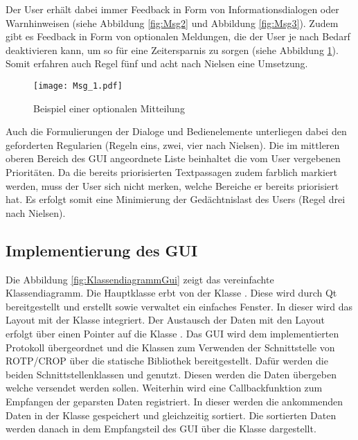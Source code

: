 Der User erh{\"a}lt dabei immer Feedback in Form von
Informationsdialogen oder Warnhinweisen (siehe Abbildung \ref{fig:Msg2} und
Abbildung
\ref{fig:Msg3}). Zudem gibt es Feedback in Form von optionalen Meldungen, die
der User je nach Bedarf deaktivieren kann, um so f{\"u}r eine Zeitersparnis zu
sorgen (siehe Abbildung \ref{fig:Msg1}). Somit erfahren auch Regel f{\"u}nf und
acht nach Nielsen eine Umsetzung.

\begin{figure}[H]
	\centering
	\texttt{[image: Msg\_1.pdf]}
	\caption{Beispiel einer optionalen Mitteilung}
	\label{fig:Msg1}
\end{figure}

Auch die Formulierungen der Dialoge und Bedienelemente unterliegen dabei den
geforderten Regularien (Regeln eins, zwei, vier nach Nielsen). Die im mittleren
oberen Bereich des \gls{GUI} angeordnete Liste beinhaltet die vom User
vergebenen Priorit{\"a}ten. Da die bereits priorisierten Textpassagen zudem farblich
markiert werden, muss der User sich nicht merken, welche Bereiche er bereits
priorisiert hat. Es erfolgt somit eine Minimierung der Ged{\"a}chtnislast des
Users (Regel drei nach Nielsen).

\subsection{Implementierung des GUI}

Die Abbildung \ref{fig:KlassendiagrammGui} zeigt das vereinfachte
Klassendiagramm.
Die Hauptklasse  erbt von der Klasse . Diese
wird durch Qt bereitgestellt und erstellt sowie verwaltet ein einfaches Fenster.
In dieser wird das Layout mit der Klasse  integriert.
Der Austausch der Daten mit den Layout erfolgt über einen Pointer auf die
Klasse . \newline
Das \gls{GUI} wird dem implementierten Protokoll übergeordnet und die Klassen
zum Verwenden der Schnittstelle von \gls{ROTP}/\gls{CROP} über die statische
Bibliothek bereitgestellt. Dafür werden die beiden Schnittstellenklassen
 und  genutzt. Diesen werden die Daten
übergeben welche versendet werden sollen. Weiterhin wird eine Callbackfunktion
zum Empfangen der geparsten Daten registriert. In dieser werden die ankommenden
Daten in der Klasse  gespeichert und gleichzeitig
sortiert. Die sortierten Daten werden danach in dem Empfangsteil des \gls{GUI}
über die Klasse  dargestellt.

